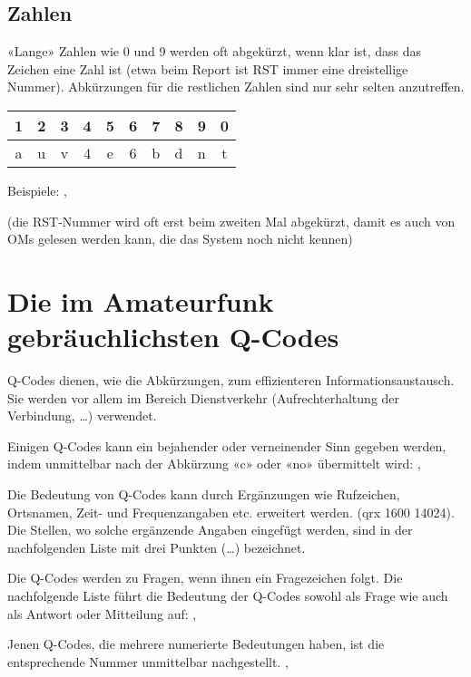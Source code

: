 \subsection{Zahlen}
«Lange» Zahlen wie 0 und 9 werden oft abgekürzt, wenn klar ist, dass das Zeichen eine Zahl ist (etwa beim Report ist RST immer eine dreistellige Nummer). Abkürzungen für die restlichen Zahlen sind nur sehr selten anzutreffen.

\vspace{1em}
{
\begin{tabular}{cccccccccc}
1 & 2 & 3 & 4 & 5 & 6 & 7 & 8 & 9 & 0 \\
\toprule
a & u & v & 4 & e & 6 & b & d & n & t
\end{tabular}
}
\vspace{1em}

Beispiele: , 

(die RST-Nummer wird oft erst beim zweiten Mal abgekürzt, damit es auch von OMs gelesen werden kann, die das System noch nicht kennen)

\section{Die im Amateurfunk gebräuchlichsten Q-Codes}\label{sec:qcodes}
Q-Codes dienen, wie die Abkürzungen, zum effizienteren Informationsaustausch. Sie werden vor allem im Bereich Dienstverkehr (Aufrechterhaltung der Verbindung, …) verwendet.

Einigen Q-Codes kann ein bejahender oder verneinender Sinn gegeben werden, indem unmittelbar nach der Abkürzung «c» oder «no» übermittelt wird: , 

Die Bedeutung von Q-Codes kann durch Ergänzungen wie Rufzeichen, Ortsnamen, Zeit- und Frequenzangaben etc. erweitert werden. (qrx 1600 14024). Die Stellen, wo solche ergänzende Angaben eingefügt werden, sind in der nachfolgenden Liste mit drei Punkten (…) bezeichnet. 

Die Q-Codes werden zu Fragen, wenn ihnen ein Fragezeichen folgt. Die nachfolgende Liste führt die Bedeutung der Q-Codes sowohl als Frage wie auch als Antwort oder Mitteilung auf: , 

Jenen Q-Codes, die mehrere numerierte Bedeutungen haben, ist die entsprechende Nummer unmittelbar nachgestellt. , 

